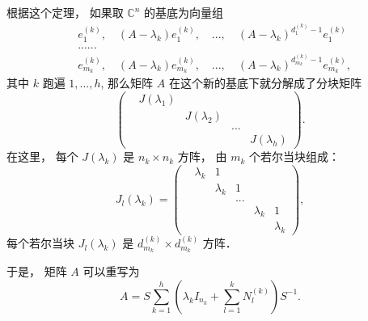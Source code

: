 根据这个定理， 如果取 $\mathbb{C}^n$ 的基底为向量组
$$
\begin{aligned}
&e^{(k)}_1,\quad(A-\lambda_k)e^{(k)}_1,\quad...,\quad(A-\lambda_k)^{d^{(k)}_1-1}e^{(k)}_1\\
&......\\
&e^{(k)}_{m_k},\quad(A-\lambda_k)e^{(k)}_{m_k},\quad...,\quad(A-\lambda_k)^{d^{(k)}_{m_k}-1}e^{(k)}_{m_k},
\end{aligned}
$$
其中 $k$ 跑遍 $1,...,h$, 那么矩阵 $A$ 在这个新的基底下就分解成了分块矩阵
$$
\left(
\begin{matrix}
&J(\lambda_1) &  & & \\
& &J(\lambda_2) & & \\
& & &...\\
& & & & J(\lambda_h)
\end{matrix}
\right).
$$
在这里， 每个 $J(\lambda_k)$ 是 $n_k\times n_k$ 方阵， 由 $m_k$ 个若尔当块组成：
$$
J_l(\lambda_k)
=\left(
\begin{matrix}
&\lambda_k & 1 & & & \\
& &\lambda_k & 1 & & \\
& & &...\\
& & & & \lambda_k & 1\\
& & & & & \lambda_k
\end{matrix}
\right),
$$
每个若尔当块 $J_l(\lambda_k)$ 是 $d_{m_k}^{(k)}\times d_{m_k}^{(k)}$ 方阵．

于是， 矩阵 $A$ 可以重写为
$$
A=S\sum_{k=1}^h\left(\lambda_kI_{n_k}+\sum_{l=1}^k N_l^{(k)}\right)S^{-1}.
$$